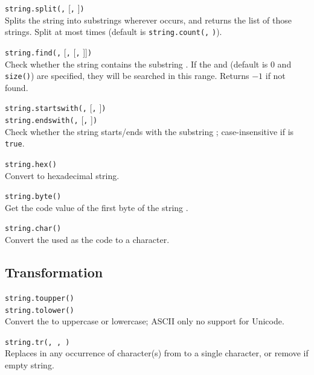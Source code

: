 \hangpar \texttt{string.split(}\texttt{,} [\texttt{,} ]\texttt{)}\\
Splits the string  into substrings wherever  occurs, and returns the list of those strings. Split at most  times (default is \texttt{string.count(}\texttt{,} \texttt{)}).

\hangpar \texttt{string.find(}\texttt{,} [\texttt{,} [\texttt{,} ]]\texttt{)}\\
Check whether the string  contains the substring . If the  and  (default is $0$ and \texttt{size(}\texttt{)}) are specified, they will be searched in this range. Returns $-1$ if not found.

\hangpartwo \texttt{string.startswith(}\texttt{,} [\texttt{,} ]\texttt{)}\\
\texttt{string.endswith(}\texttt{,} [\texttt{,} ]\texttt{)}\\
Check whether the string  starts/ends with the substring ; case-insensitive if  is \texttt{true}.

\hangpar \texttt{string.hex(}\texttt{)}\\
Convert  to hexadecimal string.

\hangpar \texttt{string.byte(}\texttt{)}\\
Get the code value of the first byte of the string .

\hangpar \texttt{string.char(}\texttt{)}\\
Convert the  used as the code to a character.

\subsection*{Transformation}

\hangpartwo \texttt{string.toupper(}\texttt{)}\\
\texttt{string.tolower(}\texttt{)}\\
Convert the  to uppercase or lowercase; ASCII only no support for Unicode.

\hangpar \texttt{string.tr(}\texttt{, }\texttt{, }\texttt{)}\\
Replaces in  any occurrence of character(s) from  to a single character, or remove if empty string.

